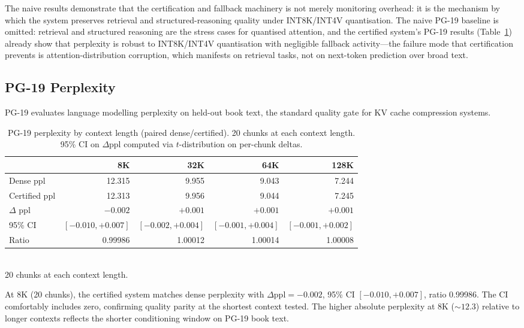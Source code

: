 \documentclass[10pt,twocolumn,a4paper]{article}
\theoremstyle{definition}
\theoremstyle{remark}
\begin{document}
The naive results demonstrate that the certification and fallback machinery is not merely monitoring overhead: it is the mechanism by which the system preserves retrieval and structured-reasoning quality under INT8K/INT4V quantisation.  The naive PG-19 baseline is omitted: retrieval and structured reasoning are the stress cases for quantised attention, and the certified system's PG-19 results (Table~\ref{tab:pg19}) already show that perplexity is robust to INT8K/INT4V quantisation with negligible fallback activity---the failure mode that certification prevents is attention-distribution corruption, which manifests on retrieval tasks, not on next-token prediction over broad text.

\subsection{PG-19 Perplexity}

PG-19 evaluates language modelling perplexity on held-out book text, the standard quality gate for KV cache compression systems.

\begin{table}[!t]
\centering
\caption{PG-19 perplexity by context length (paired dense/certified).  20 chunks at each context length.  95\% CI on $\Delta$ppl computed via $t$-distribution on per-chunk deltas.}
\label{tab:pg19}
\small
\begin{tabular}{lrrrr}
\toprule
& \textbf{8K} & \textbf{32K} & \textbf{64K} & \textbf{128K} \\
\midrule
Dense ppl     & 12.315 & 9.955 & 9.043 & 7.244 \\
Certified ppl & 12.313 & 9.956 & 9.044 & 7.245 \\
$\Delta$ ppl  & $-0.002$ & $+0.001$ & $+0.001$ & $+0.001$ \\
95\% CI       & $[-0.010, +0.007]$ & $[-0.002, +0.004]$ & $[-0.001, +0.004]$ & $[-0.001, +0.002]$ \\
Ratio         & 0.99986 & 1.00012 & 1.00014 & 1.00008 \\
\bottomrule
\end{tabular}
\\[2pt]
{\scriptsize 20 chunks at each context length.}
\end{table}

At 8K (20 chunks), the certified system matches dense perplexity with $\Delta\mathrm{ppl}{=}{-}0.002$, 95\% CI $[-0.010, +0.007]$, ratio 0.99986.  The CI comfortably includes zero, confirming quality parity at the shortest context tested.  The higher absolute perplexity at 8K (${\sim}12.3$) relative to longer contexts reflects the shorter conditioning window on PG-19 book text.
\end{document}
